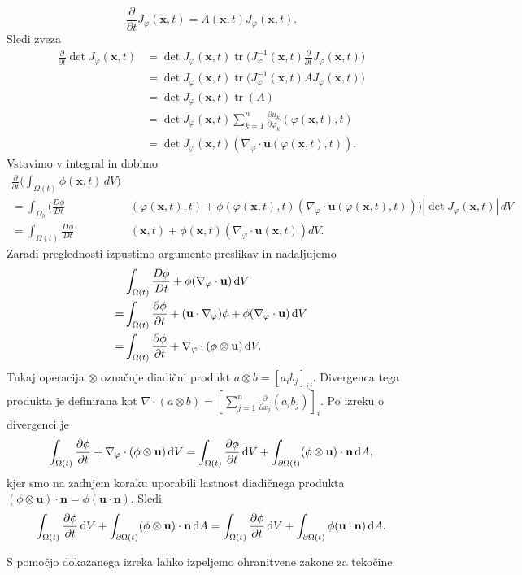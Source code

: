 \documentclass[mat2, tisk]{fmfdelo}
\newcommand{\bd}{\textbf}
\begin{document}
\begin{dokaz}
$$
\frac{\partial}{\partial t} J_\varphi(\bd{x}, t) = A(\bd{x}, t) J_\varphi(\bd{x}, t).
$$
Sledi zveza
\begin{align*}
\frac{\partial}{\partial t} \det{J_\varphi(\bd{x}, t)} &= \det{J_\varphi(\bd{x}, t)} \operatorname{tr}\Big(J_\varphi^{-1}(\bd{x}, t) \frac{\partial}{\partial t} J_\varphi(\bd{x}, t)\Big) \\
&= \det{J_\varphi(\bd{x}, t)} \operatorname{tr}\Big(J_\varphi^{-1}(\bd{x}, t) A J_\varphi(\bd{x}, t)\Big) \\
&= \det{J_\varphi(\bd{x}, t)} \operatorname{tr}(A) \\
&= \det{J_\varphi(\bd{x}, t)} \sum_{k=1}^{n} \frac{\partial u_k}{\partial \varphi_k}(\varphi(\bd{x}, t), t) \\
&= \det{J_\varphi(\bd{x}, t)} (\nabla_\varphi \cdot \bd{u}(\varphi(\bd{x}, t), t)).
\end{align*}
Vstavimo v integral in dobimo
\begin{align*}
\frac{\partial}{\partial t} \Big(\int_{\Omega(t)} \phi(\mathbf{x},t)\, dV\Big) & \\
=\int_{\Omega_0} \Big(\frac{D \phi}{D t}&(\varphi(\bd{x}, t), t) + \phi(\varphi({\mathbf{x}},t), t)(\nabla_\varphi \cdot \bd{u}(\varphi(\bd{x}, t), t)) \Big) |\det{J_\varphi(\bd{x}, t)}| \, dV \\
= \int_{\Omega(t)} \frac{D \phi}{D t}&(\bd{x}, t) + \phi(\bd{x},t)(\nabla_\varphi \cdot \bd{u}(\bd{x}, t)) dV.
\end{align*}
Zaradi preglednosti izpustimo argumente preslikav in nadaljujemo
\begin{align*}
&\int_{\Omega(t)} \frac{D \phi}{D t} + \phi(\nabla_\varphi \cdot \bd{u}) \dif V \\
= &\int_{\Omega(t)} \frac{\partial \phi}{\partial t} + (\bd{u} \cdot \nabla_\varphi) \phi + \phi(\nabla_\varphi \cdot \bd{u}) \dif V \\
= &\int_{\Omega(t)} \frac{\partial \phi}{\partial t} + \nabla_\varphi \cdot (\phi \otimes \bd{u}) \dif V.
\end{align*}
Tukaj operacija $\otimes$ označuje diadični produkt $a\otimes b = [a_i b_j]_{ij}$. Divergenca 
tega produkta je definirana kot $\nabla \cdot (a \otimes b) = [\sum_{j=1}^n \frac{\partial}{\partial x_j} (a_i b_j)]_i$.
Po izreku o divergenci je
\begin{align*}
  \int_{\Omega(t)} \frac{\partial \phi}{\partial t} + \nabla_\varphi \cdot (\phi \otimes \bd{u}) \dif V = \int_{\Omega(t)} \frac{\partial \phi}{\partial t} \dif V + \int_{\partial\Omega(t)} (\phi \otimes \bd{u}) \cdot \bd{n} \dif A,
\end{align*}
kjer smo na zadnjem koraku uporabili lastnost diadičnega produkta $(\phi \otimes \bd{u}) \cdot \bd{n} = \phi (\bd{u} \cdot \bd{n})$. Sledi
\begin{align*}
  \int_{\Omega(t)} \frac{\partial \phi}{\partial t} \dif V + \int_{\partial\Omega(t)} (\phi \otimes \bd{u}) \cdot \bd{n} \dif A = \int_{\Omega(t)} \frac{\partial \phi}{\partial t} \dif V + \int_{\partial\Omega(t)} \phi (\bd{u} \cdot \bd{n}) \dif A.
\end{align*}
\end{dokaz}
S pomočjo dokazanega izreka lahko izpeljemo ohranitvene zakone za tekočine.
\end{document}

